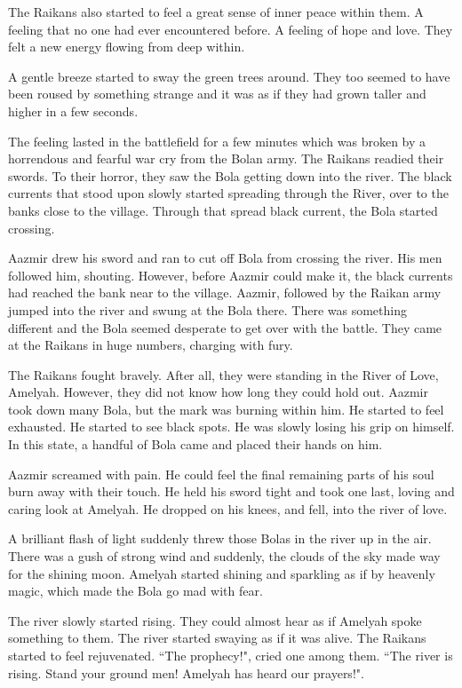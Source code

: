 \documentclass[twoside,11pt,titlepage]{article}
\begin{document}
The Raikans also started to feel a great sense of inner peace within them. A feeling that no one had ever encountered before. A feeling of hope and love. They felt a new energy flowing from deep within.

A gentle breeze started to sway the green trees around. They too seemed to have been roused by something strange and it was as if they had grown taller and higher in a few seconds.

The feeling lasted in the battlefield for a few minutes which was broken by a horrendous and fearful war cry from the Bolan army. The Raikans readied their swords. To their horror, they saw the Bola getting down into the river. The black currents that stood upon slowly started spreading through the River, over to the banks close to the village. Through that spread black current, the Bola started crossing.

Aazmir drew his sword and ran to cut off Bola from crossing the river. His men followed him, shouting. However, before Aazmir could make it, the black currents had reached the bank near to the village. Aazmir, followed by the Raikan army jumped into the river and swung at the Bola there. There was something different and the Bola seemed desperate to get over with the battle. They came at the Raikans in huge numbers, charging with fury.

The Raikans fought bravely. After all, they were standing in the River of Love, Amelyah. However, they did not know how long they could hold out. Aazmir took down many Bola, but the mark was burning within him. He started to feel exhausted. He started to see black spots. He was slowly losing his grip on himself. In this state, a handful of Bola came and placed their hands on him.

Aazmir screamed with pain. He could feel the final remaining parts of his soul burn away with their touch. He held his sword tight and took one last, loving and caring look at Amelyah. He dropped on his knees, and fell, into the river of love.

A brilliant flash of light suddenly threw those Bolas in the river up in the air. There was a gush of strong wind and suddenly, the clouds of the sky made way for the shining moon. Amelyah started shining and sparkling as if by heavenly magic, which made the Bola go mad with fear.

The river slowly started rising. They could almost hear as if Amelyah spoke something to them. The river started swaying as if it was alive. The Raikans started to feel rejuvenated. ``The prophecy!", cried one among them. ``The river is rising. Stand your ground men! Amelyah has heard our prayers!".
\end{document}
